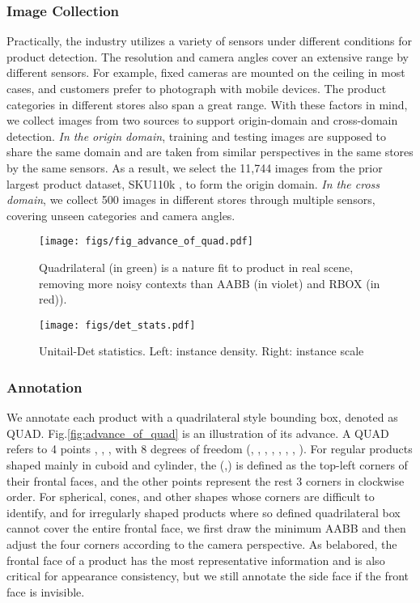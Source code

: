 \documentclass[runningheads]{llncs}
\begin{document}
\subsubsection{Image Collection} 
Practically, the industry utilizes a variety of sensors under different conditions for product detection. The resolution and camera angles cover an extensive range by different sensors.
For example, fixed cameras are mounted on the ceiling in most cases, and customers prefer to photograph with mobile devices. The product categories in different stores also span a great range.
With these factors in mind, we collect images from two sources to support origin-domain and cross-domain detection. 
\textit{In the origin domain}, training and testing images are supposed to share the same domain and are taken from similar perspectives in the same stores by the same sensors. As a result, we select the 11,744 images from the prior largest product dataset, SKU110k \cite{SKU110k}, to form the origin domain. 
\textit{In the cross domain}, we collect 500 images in different stores through multiple sensors, covering unseen categories and camera angles.

\begin{figure}[t]
    \begin{minipage}{.48\columnwidth}
    \centering
    \texttt{[image: figs/fig\_advance\_of\_quad.pdf]}
    \caption{Quadrilateral (in green) is a nature fit to product in real scene, removing more noisy contexts than AABB (in violet) and RBOX (in red)).}
    \label{fig:advance_of_quad}
    \end{minipage}\hfill
    \begin{minipage}{.47\columnwidth}
    \centering
    \texttt{[image: figs/det\_stats.pdf]}
    \caption{Unitail-Det statistics. Left: instance density. Right: instance scale}
    \label{fig:det_stats}
    \end{minipage}
\end{figure}


\subsubsection{Annotation} We annotate each product with a quadrilateral style bounding box, denoted as QUAD. Fig.\ref{fig:advance_of_quad} is an illustration of its advance. A QUAD refers to 4 points , , ,  with 8 degrees of freedom (, , , , , , , ). For regular products shaped mainly in cuboid and cylinder, the (,) is defined as the top-left corners of their frontal faces, and the other points represent the rest 3 corners in clockwise order. For spherical, cones, and other shapes whose corners are difficult to identify, and for irregularly shaped products where so defined quadrilateral box cannot cover the entire frontal face, we first draw the minimum AABB and then adjust the four corners according to the camera perspective. 
As belabored, the frontal face of a product has the most representative information and is also critical for appearance consistency, but we still annotate the side face if the front face is invisible. 
\end{document}
